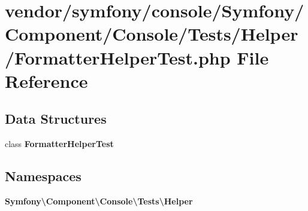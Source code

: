 \section{vendor/symfony/console/\+Symfony/\+Component/\+Console/\+Tests/\+Helper/\+Formatter\+Helper\+Test.php File Reference}
\label{_formatter_helper_test_8php}
\subsection*{Data Structures}
\begin{DoxyCompactItemize}
\item 
class {\bf Formatter\+Helper\+Test}
\end{DoxyCompactItemize}
\subsection*{Namespaces}
\begin{DoxyCompactItemize}
\item 
 {\bf Symfony\textbackslash{}\+Component\textbackslash{}\+Console\textbackslash{}\+Tests\textbackslash{}\+Helper}
\end{DoxyCompactItemize}
